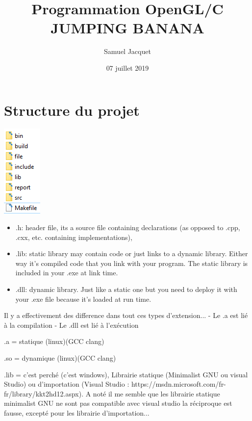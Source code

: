 \documentclass[12pt]{article}
\title{Programmation OpenGL/C\\
JUMPING BANANA}
\author{Samuel Jacquet}
\date{07 juillet 2019}
\begin{document}
\maketitle
\newpage
\tableofcontents
\newpage

\section{Structure du projet}


\begin{center}
\includegraphics[scale=1.0]{pic/struct.PNG}
\label{fig1}
\end{center}
\begin{itemize}
\item .h: header file, its a source file containing declarations (as opposed to .cpp, .cxx, etc. containing implementations), \\
\item .lib: static library may contain code or just links to a dynamic library. Either way it's compiled code that you link with your program. The static library is included in your .exe at link time. \\
\item .dll: dynamic library. Just like a static one but you need to deploy it with your .exe file because it's loaded at run time.
\end{itemize}
Il y a effectivement des difference dans tout ces types d'extension...
- Le .a est lié à la compilation
- Le .dll est lié à l'exécution

.a = statique (linux)(GCC clang)

.so = dynamique (linux)(GCC clang)

.lib = c'est perché (c'est windows), Librairie statique (Minimalist GNU ou visual Studio) ou d'importation (Visual Studio : https://msdn.microsoft.com/fr-fr/library/kkt2hd12.aspx). 
A noté il me semble que les librairie statique minimalist GNU ne sont pas compatible avec visual studio la réciproque est fausse, excepté pour les librairie d'importation...
\end{document}
